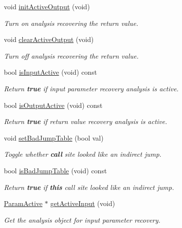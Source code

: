 \begin{DoxyCompactItemize}
void \mbox{\hyperlink{class_func_call_specs_a87904aacb6678c8bde4c0c2c781db830}{init\+Active\+Output}} (void)
\begin{DoxyCompactList}\small\item\em Turn on analysis recovering the return value. \end{DoxyCompactList}\item 
void \mbox{\hyperlink{class_func_call_specs_a5c13854db24718357b5ce7de7802b4ed}{clear\+Active\+Output}} (void)
\begin{DoxyCompactList}\small\item\em Turn off analysis recovering the return value. \end{DoxyCompactList}\item 
bool \mbox{\hyperlink{class_func_call_specs_a4145c5e63b80ece45a2a4f0fd5949138}{is\+Input\+Active}} (void) const
\begin{DoxyCompactList}\small\item\em Return {\bfseries{true}} if input parameter recovery analysis is active. \end{DoxyCompactList}\item 
bool \mbox{\hyperlink{class_func_call_specs_a81e8386ebb901a273ef40d8e8430fb57}{is\+Output\+Active}} (void) const
\begin{DoxyCompactList}\small\item\em Return {\bfseries{true}} if return value recovery analysis is active. \end{DoxyCompactList}\item 
void \mbox{\hyperlink{class_func_call_specs_abe07c5f01eaa2171a4d8c4c832910022}{set\+Bad\+Jump\+Table}} (bool val)
\begin{DoxyCompactList}\small\item\em Toggle whether {\bfseries{call}} site looked like an indirect jump. \end{DoxyCompactList}\item 
bool \mbox{\hyperlink{class_func_call_specs_ae9f1afc18ffb30d43e25b0065823f366}{is\+Bad\+Jump\+Table}} (void) const
\begin{DoxyCompactList}\small\item\em Return {\bfseries{true}} if {\bfseries{this}} call site looked like an indirect jump. \end{DoxyCompactList}\item 
\mbox{\hyperlink{class_param_active}{Param\+Active}} $\ast$ \mbox{\hyperlink{class_func_call_specs_a32432a6c7b201dc160ae0b2480a1b8b9}{get\+Active\+Input}} (void)
\begin{DoxyCompactList}\small\item\em Get the analysis object for input parameter recovery. \end{DoxyCompactList}\item 

\end{DoxyCompactItemize}
